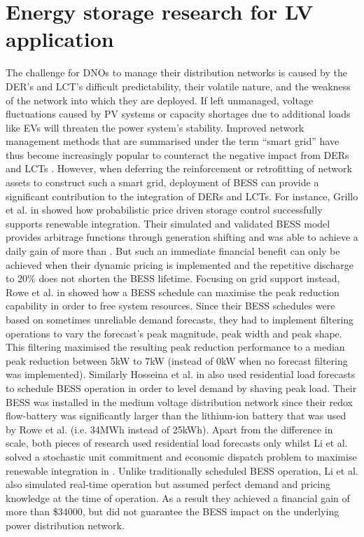 \section{Energy storage research for LV application}
\label{ch-literature:sec:energy-storage}

The challenge for DNOs to manage their distribution networks is caused by the DER's and LCT's difficult predictability, their volatile nature, and the weakness of the network into which they are deployed.
If left unmanaged, voltage fluctuations caused  by PV systems \cite{Woyte2006, Bravo2015} or capacity shortages due to additional loads like EVs \cite{Mohd2008a, Koureoumpezis2010} will threaten the power system's stability.
Improved network management methods that are summarised under the term ``smart grid'' have thus become increasingly popular to counteract the negative impact from DERs and LCTs \cite{Panteli2015}.
However, when deferring the reinforcement or retrofitting of network assets to construct such a smart grid, deployment of BESS can provide a significant contribution to the integration of DERs and LCTs.
For instance, Grillo et al. in \cite{Grillo2012} showed how probabilistic price driven storage control successfully supports renewable integration.
Their simulated and validated BESS model provides arbitrage functions through generation shifting and was able to achieve a daily gain of more than .
But such an immediate financial benefit can only be achieved when their dynamic pricing is implemented and the repetitive discharge to 20\% does not shorten the BESS lifetime.
Focusing on grid support instead, Rowe et al. in \cite{Rowe2014a} showed how a BESS schedule can maximise the peak reduction capability in order to free system resources.
Since their BESS schedules were based on sometimes unreliable demand forecasts, they had to implement filtering operations to vary the forecast's peak magnitude, peak width and peak shape.
This filtering maximised the resulting peak reduction performance to a median peak reduction between 5kW to 7kW (instead of 0kW when no forecast filtering was implemented).
Similarly Hosseina et al. in \cite{Hosseina2016a} also used residential load forecasts to schedule BESS operation in order to level demand by shaving peak load.
Their BESS was installed in the medium voltage distribution network since their redox flow-battery was significantly larger than the lithium-ion battery that was used by Rowe et al. (i.e. 34MWh instead of 25kWh).
Apart from the difference in scale, both pieces of research used residential load forecasts only whilst Li et al. solved a stochastic unit commitment and economic dispatch problem to maximise renewable integration in \cite{Li2016}.
Unlike traditionally scheduled BESS operation, Li et al. also simulated real-time operation but assumed perfect demand and pricing knowledge at the time of operation.
As a result they achieved a financial gain of more than \$34000, but did not guarantee the BESS impact on the underlying power distribution network.

